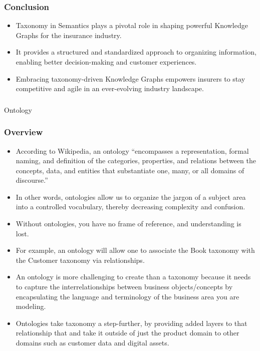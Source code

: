 \begin{frame}[fragile]
\frametitle{Conclusion}
\begin{itemize}
\item Taxonomy in Semantics plays a pivotal role in shaping powerful Knowledge Graphs for the insurance industry.
\item It provides a structured and standardized approach to organizing information, enabling better decision-making and customer experiences.
\item Embracing taxonomy-driven Knowledge Graphs empowers insurers to stay competitive and agile in an ever-evolving industry landscape.
\end{itemize}
\end{frame}


\begin{frame}[fragile]\frametitle{}
\begin{center}
{\Large Ontology }
\end{center}
\end{frame}

\begin{frame}[fragile]
\frametitle{Overview}
\begin{itemize}
\item According to Wikipedia, an ontology “encompasses a representation, formal naming, and definition of the categories, properties, and relations between the concepts, data, and entities that substantiate one, many, or all domains of discourse.”
\item In other words, ontologies allow us to organize the jargon of a subject area into a controlled vocabulary, thereby decreasing complexity and confusion. 
\item Without ontologies, you have no frame of reference, and understanding is lost.
\item For example, an ontology will allow one to associate the Book taxonomy with the Customer taxonomy via relationships.
\item An ontology is more challenging to create than a taxonomy because it needs to capture the interrelationships between business objects/concepts by encapsulating the language and terminology of the business area you are modeling.
\item Ontologies take taxonomy a step-further, by providing added layers to that relationship that and take it outside of just the product domain to other domains such as customer data and digital assets.   
\end{itemize}
\end{frame}

